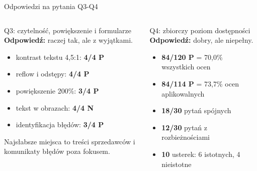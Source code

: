 \documentclass[aspectratio=169,11pt]{beamer}
\begin{document}
\begin{frame}{Odpowiedzi na pytania Q3-Q4}
  \small
  \begin{columns}[T,totalwidth=\textwidth]
      \begin{block}{Q3: czytelność, powiększenie i formularze}
        \textbf{Odpowiedź:} raczej tak, ale z wyjątkami.

        \vspace{0.15cm}
        \begin{itemize}
          \item kontrast tekstu 4,5:1: \textbf{4/4 P}
          \item reflow i odstępy: \textbf{4/4 P}
          \item powiększenie 200\%: \textbf{3/4 P}
          \item tekst w obrazach: \textbf{4/4 N}
          \item identyfikacja błędów: \textbf{3/4 P}
        \end{itemize}

        \vspace{0.1cm}
        \footnotesize Najsłabsze miejsca to treści sprzedawców i komunikaty błędów poza fokusem.
      \end{block}

      \begin{block}{Q4: zbiorczy poziom dostępności}
        \textbf{Odpowiedź:} dobry, ale niepełny.

        \vspace{0.15cm}
        \begin{itemize}
          \item \textbf{84/120 P} = 70,0\% wszystkich ocen
          \item \textbf{84/114 P} = 73,7\% ocen aplikowalnych
          \item \textbf{18/30} pytań spójnych
          \item \textbf{12/30} pytań z rozbieżnościami
          \item \textbf{10} usterek: 6 istotnych, 4 nieistotne
        \end{itemize}
      \end{block}
  \end{columns}
\end{frame}
\end{document}
